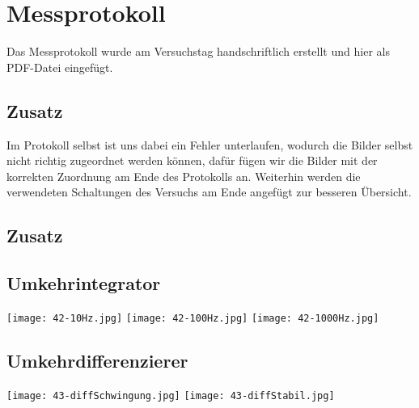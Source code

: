 

\def\skalierung{0.65}

\chapter{Messprotokoll}
\label{chap:protokoll}

Das Messprotokoll wurde am Versuchstag handschriftlich erstellt und hier als
PDF-Datei eingefügt. 

\section*{Zusatz}
Im Protokoll selbst ist uns dabei ein Fehler unterlaufen, wodurch die Bilder selbst nicht richtig zugeordnet werden können, dafür fügen wir die Bilder mit der korrekten Zuordnung am Ende des Protokolls an. Weiterhin werden die verwendeten Schaltungen des Versuchs am Ende angefügt zur besseren Übersicht.

%

\section*{Zusatz}

\section*{Umkehrintegrator}
\begin{center}
    \texttt{[image: 42-10Hz.jpg]}
    \texttt{[image: 42-100Hz.jpg]}
    \texttt{[image: 42-1000Hz.jpg]}
\end{center}

\section*{Umkehrdifferenzierer}
\begin{center}
    \texttt{[image: 43-diffSchwingung.jpg]}
    \texttt{[image: 43-diffStabil.jpg]}
\end{center}

